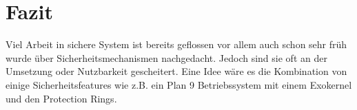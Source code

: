 \documentclass[9pt,technote]{IEEEtran}
\begin{document}
     
        
%   
    
  \section{Fazit}
    Viel Arbeit in sichere System ist bereits geflossen vor allem auch schon sehr fr\"uh wurde \"uber Sicherheitsmechanismen nachgedacht.
    Jedoch sind sie oft an der Umsetzung oder Nutzbarkeit gescheitert. Eine Idee w\"are es die Kombination von einige Sicherheitsfeatures
    wie z.B. ein Plan 9 Betriebssystem mit einem Exokernel und den Protection Rings.
    
    
   \nocite{*}     


\end{document}

